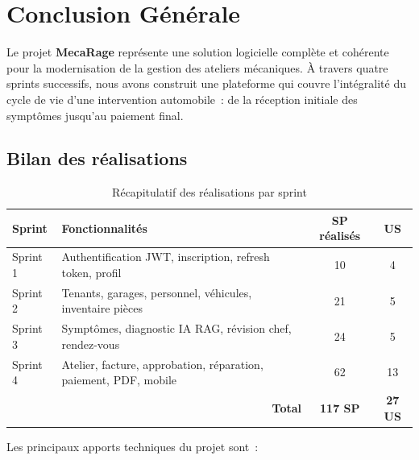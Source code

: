 \chapter*{Conclusion Générale}
\thispagestyle{plain}


Le projet \textbf{MecaRage} représente une solution logicielle complète et
cohérente pour la modernisation de la gestion des ateliers mécaniques. À travers
quatre sprints successifs, nous avons construit une plateforme qui couvre
l'intégralité du cycle de vie d'une intervention automobile~: de la réception
initiale des symptômes jusqu'au paiement final.

\section*{Bilan des réalisations}

\begin{table}[H]
\centering
\caption{Récapitulatif des réalisations par sprint}
\label{tab:bilan}
\begin{tabularx}{\textwidth}{|l|X|c|c|}
\hline
\rowcolor{gray!20}
\textbf{Sprint} & \textbf{Fonctionnalités} & \textbf{SP réalisés} & \textbf{US} \\
\hline
Sprint 1 & Authentification JWT, inscription, refresh token, profil & 10 & 4 \\[2pt]\hline
Sprint 2 & Tenants, garages, personnel, véhicules, inventaire pièces & 21 & 5 \\[2pt]\hline
Sprint 3 & Symptômes, diagnostic IA RAG, révision chef, rendez-vous & 24 & 5 \\[2pt]\hline
Sprint 4 & Atelier, facture, approbation, réparation, paiement, PDF, mobile & 62 & 13 \\[2pt]\hline
\multicolumn{2}{|r|}{\textbf{Total}} & \textbf{117 SP} & \textbf{27 US} \\
\hline
\end{tabularx}
\end{table}

\noindent Les principaux apports techniques du projet sont~:

